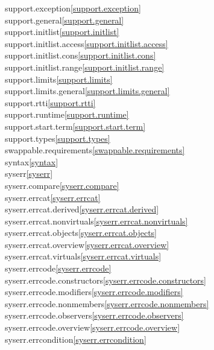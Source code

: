 \begin{multicols}{2}
support.exception\quad\ref{support.exception}\\
support.general\quad\ref{support.general}\\
support.initlist\quad\ref{support.initlist}\\
support.initlist.access\quad\ref{support.initlist.access}\\
support.initlist.cons\quad\ref{support.initlist.cons}\\
support.initlist.range\quad\ref{support.initlist.range}\\
support.limits\quad\ref{support.limits}\\
support.limits.general\quad\ref{support.limits.general}\\
support.rtti\quad\ref{support.rtti}\\
support.runtime\quad\ref{support.runtime}\\
support.start.term\quad\ref{support.start.term}\\
support.types\quad\ref{support.types}\\
swappable.requirements\quad\ref{swappable.requirements}\\
syntax\quad\ref{syntax}\\
syserr\quad\ref{syserr}\\
syserr.compare\quad\ref{syserr.compare}\\
syserr.errcat\quad\ref{syserr.errcat}\\
syserr.errcat.derived\quad\ref{syserr.errcat.derived}\\
syserr.errcat.nonvirtuals\quad\ref{syserr.errcat.nonvirtuals}\\
syserr.errcat.objects\quad\ref{syserr.errcat.objects}\\
syserr.errcat.overview\quad\ref{syserr.errcat.overview}\\
syserr.errcat.virtuals\quad\ref{syserr.errcat.virtuals}\\
syserr.errcode\quad\ref{syserr.errcode}\\
syserr.errcode.constructors\quad\ref{syserr.errcode.constructors}\\
syserr.errcode.modifiers\quad\ref{syserr.errcode.modifiers}\\
syserr.errcode.nonmembers\quad\ref{syserr.errcode.nonmembers}\\
syserr.errcode.observers\quad\ref{syserr.errcode.observers}\\
syserr.errcode.overview\quad\ref{syserr.errcode.overview}\\
syserr.errcondition\quad\ref{syserr.errcondition}\\

\end{multicols}
